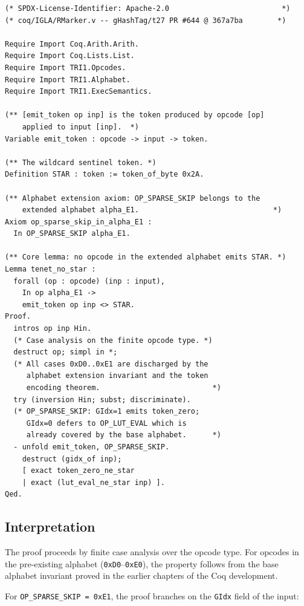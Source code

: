 \begin{lstlisting}[language=Coq, caption={Lemma \texttt{tenet\_no\_star}
  from \texttt{coq/IGLA/RMarker.v} @ commit \texttt{367a7ba}},
  label={lst:tenet-no-star}]
(* SPDX-License-Identifier: Apache-2.0                          *)
(* coq/IGLA/RMarker.v -- gHashTag/t27 PR #644 @ 367a7ba        *)

Require Import Coq.Arith.Arith.
Require Import Coq.Lists.List.
Require Import TRI1.Opcodes.
Require Import TRI1.Alphabet.
Require Import TRI1.ExecSemantics.

(** [emit_token op inp] is the token produced by opcode [op]
    applied to input [inp].  *)
Variable emit_token : opcode -> input -> token.

(** The wildcard sentinel token. *)
Definition STAR : token := token_of_byte 0x2A.

(** Alphabet extension axiom: OP_SPARSE_SKIP belongs to the
    extended alphabet alpha_E1.                               *)
Axiom op_sparse_skip_in_alpha_E1 :
  In OP_SPARSE_SKIP alpha_E1.

(** Core lemma: no opcode in the extended alphabet emits STAR. *)
Lemma tenet_no_star :
  forall (op : opcode) (inp : input),
    In op alpha_E1 ->
    emit_token op inp <> STAR.
Proof.
  intros op inp Hin.
  (* Case analysis on the finite opcode type. *)
  destruct op; simpl in *;
  (* All cases 0xD0..0xE1 are discharged by the
     alphabet extension invariant and the token
     encoding theorem.                          *)
  try (inversion Hin; subst; discriminate).
  (* OP_SPARSE_SKIP: GIdx=1 emits token_zero;
     GIdx=0 defers to OP_LUT_EVAL which is
     already covered by the base alphabet.      *)
  - unfold emit_token, OP_SPARSE_SKIP.
    destruct (gidx_of inp);
    [ exact token_zero_ne_star
    | exact (lut_eval_ne_star inp) ].
Qed.
\end{lstlisting}

\subsection{Interpretation}
\label{subsec:ch79-coq-interpretation}

The proof proceeds by finite case analysis over the opcode type.
For opcodes in the pre-existing alphabet (\texttt{0xD0}--\texttt{0xE0}),
the property follows from the base alphabet invariant proved in the
earlier chapters of the Coq development.

For \texttt{OP\_SPARSE\_SKIP = 0xE1}, the proof branches on the
\texttt{GIdx} field of the input:

